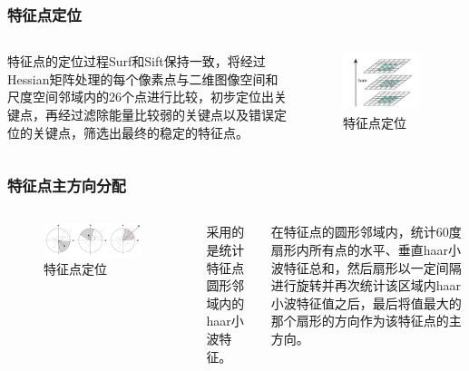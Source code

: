 \documentclass[presentation,aspectratio=1610]{beamer}
\begin{document}
\begin{frame}
	\frametitle{特征点定位}
	\begin{columns}
	
		特征点的定位过程Surf和Sift保持一致，将经过Hessian矩阵处理的每个像素点与二维图像空间和尺度空间邻域内的26个点进行比较，初步定位出关键点，再经过滤除能量比较弱的关键点以及错误定位的关键点，筛选出最终的稳定的特征点。	
		
		\begin{figure}[htbp!]
			\centering
			\includegraphics[width=0.9\textwidth]{img/zreo.jpg}
			\caption{特征点定位}
		\end{figure}
	\end{columns}
	
\end{frame}


\begin{frame}
	\frametitle{特征点主方向分配}
		\begin{columns}		
		\column{.5\textwidth}
		\begin{figure}[htbp!]
			\centering
			\includegraphics[width=0.9\textwidth]{img/fx.jpg}
			\caption{特征点定位}
		\end{figure}
				
			\column{.5\textwidth}
		采用的是统计特征点圆形邻域内的haar小波特征。\vspace{.5cm}
		
		在特征点的圆形邻域内，统计60度扇形内所有点的水平、垂直haar小波特征总和，然后扇形以一定间隔进行旋转并再次统计该区域内haar小波特征值之后，最后将值最大的那个扇形的方向作为该特征点的主方向。
			
		\end{columns}
\end{frame}
\end{document}
